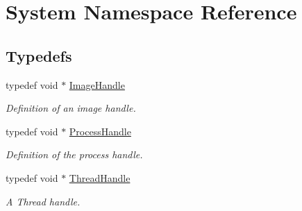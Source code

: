 \hypertarget{namespaceSystem}{}\section{System Namespace Reference}
\label{namespaceSystem}
\subsection*{Typedefs}
\begin{DoxyCompactItemize}
\item 
typedef void $\ast$ \hyperlink{namespaceSystem_a21dca3f6170a2b0a0ea3028040ba21b3}{Image\+Handle}
\begin{DoxyCompactList}\small\item\em Definition of an image handle. \end{DoxyCompactList}\item 
typedef void $\ast$ \hyperlink{namespaceSystem_a7490ee4911e28ad26aa0fcdd00a629df}{Process\+Handle}
\begin{DoxyCompactList}\small\item\em Definition of the process handle. \end{DoxyCompactList}\item 
typedef void $\ast$ \hyperlink{namespaceSystem_ad0b1bc3494d9fecebf85204f61224ac6}{Thread\+Handle}
\begin{DoxyCompactList}\small\item\em A Thread handle. \end{DoxyCompactList}\end{DoxyCompactItemize}
